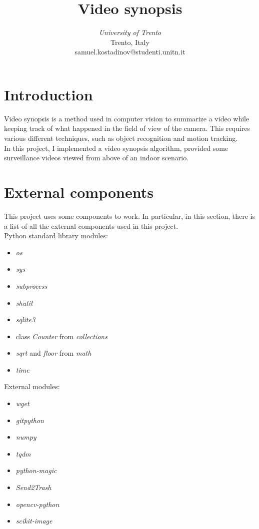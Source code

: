 \documentclass[conference]{IEEEtran}
\begin{document}
	\title{Video synopsis}


	\author{
	\textit{University of Trento}\\
	Trento, Italy \\
	samuel.kostadinov@studenti.unitn.it}


	\maketitle

	\section{Introduction}
		
		Video synopsis is a method used in computer vision to summarize a video while keeping track of what happened in the field of view of the camera.
		This requires various different techniques, such as object recognition and motion tracking.\\
		In this project, I implemented a video synopsis algorithm, provided some surveillance videos viewed from above of an indoor scenario.
		
	\section{External components}
	
		This project uses some components to work. In particular, in this section, there is a list of all the external components used in this project.\\
		Python standard library modules:
		\begin{itemize}
		
			\item \textit{os}
			\item \textit{sys}
			\item \textit{subprocess}
			\item \textit{shutil}
			\item \textit{sqlite3}
			\item class \textit{Counter} from \textit{collections}
			\item \textit{sqrt} and \textit{floor} from \textit{math}
			\item \textit{time}
		
		\end{itemize}
		
		External modules:
		\begin{itemize}
		
			\item \textit{wget}
			\item \textit{gitpython}
			\item \textit{numpy}
			\item \textit{tqdm}
			\item \textit{python-magic}
			\item \textit{Send2Trash}
			\item \textit{opencv-python}
			\item \textit{scikit-image}
		
		\end{itemize}
		
\end{document}
